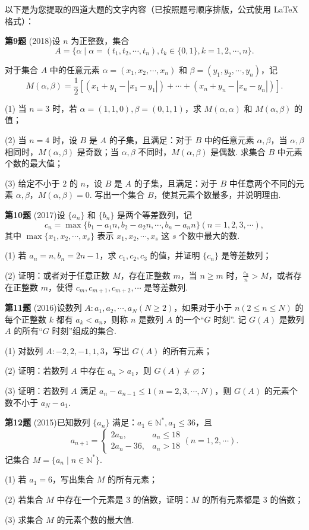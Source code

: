 \documentclass[11pt]{ctexart}
\begin{document}
以下是为您提取的四道大题的文字内容（已按照题号顺序排版，公式使用 LaTeX 格式）：

\clearpage
\textbf{第9题}
(2018)设 $n$ 为正整数，集合
$$
A = \{\alpha \mid \alpha = (t_1, t_2, \cdots, t_n), t_k \in \{0, 1\}, k = 1, 2, \cdots, n\}.
$$

对于集合 $A$ 中的任意元素 $\alpha = (x_1, x_2, \cdots, x_n)$ 和 $\beta = (y_1, y_2, \cdots, y_n)$，记
$$
M(\alpha, \beta) = \frac{1}{2}[(x_1 + y_1 - |x_1 - y_1|) + \cdots + (x_n + y_n - |x_n - y_n|)].
$$

(1) 当 $n = 3$ 时，若 $\alpha = (1, 1, 0), \beta = (0, 1, 1)$，求 $M(\alpha, \alpha)$ 和 $M(\alpha, \beta)$ 的值；

(2) 当 $n = 4$ 时，设 $B$ 是 $A$ 的子集，且满足：对于 $B$ 中的任意元素 $\alpha, \beta$，当 $\alpha, \beta$ 相同时，$M(\alpha, \beta)$ 是奇数；当 $\alpha, \beta$ 不同时，$M(\alpha, \beta)$ 是偶数. 求集合 $B$ 中元素个数的最大值；

(3) 给定不小于 $2$ 的 $n$，设 $B$ 是 $A$ 的子集，且满足：对于 $B$ 中任意两个不同的元素 $\alpha, \beta$，$M(\alpha, \beta) = 0$. 写出一个集合 $B$，使其元素个数最多，并说明理由.

\clearpage
\textbf{第10题}
(2017)设 $\{a_n\}$ 和 $\{b_n\}$ 是两个等差数列，记
$$
c_n = \max\{b_1 - a_1n, b_2 - a_2n, \cdots, b_n - a_nn\} (n = 1, 2, 3, \cdots),
$$
其中 $\max\{x_1, x_2, \cdots, x_s\}$ 表示 $x_1, x_2, \cdots, x_s$ 这 $s$ 个数中最大的数.

(1) 若 $a_n = n, b_n = 2n - 1$，求 $c_1, c_2, c_3$ 的值，并证明 $\{c_n\}$ 是等差数列；

(2) 证明：或者对于任意正数 $M$，存在正整数 $m$，当 $n \ge m$ 时，$\frac{c_n}{n} > M$，或者存在正整数 $m$，使得 $c_m, c_{m+1}, c_{m+2}, \cdots$ 是等差数列.

\clearpage
\textbf{第11题}
(2016)设数列 $A : a_1, a_2, \cdots, a_N (N \ge 2)$，如果对于小于 $n (2 \le n \le N)$ 的每个正整数 $k$ 都有 $a_k < a_n$，则称 $n$ 是数列 $A$ 的一个“$G$ 时刻”. 记 $G(A)$ 是数列 $A$ 的所有“$G$ 时刻”组成的集合.

(1) 对数列 $A : -2, 2, -1, 1, 3$，写出 $G(A)$ 的所有元素；

(2) 证明：若数列 $A$ 中存在 $a_n > a_1$，则 $G(A) \neq \varnothing$；

(3) 证明：若数列 $A$ 满足 $a_n - a_{n-1} \le 1 (n = 2, 3, \cdots, N)$，则 $G(A)$ 的元素个数不小于 $a_N - a_1$.

\clearpage
\textbf{第12题}
(2015)已知数列 $\{a_n\}$ 满足：$a_1 \in \mathbb{N}^*, a_1 \le 36$，且
$$
a_{n+1} = \begin{cases} 2a_n, & a_n \le 18 \\ 2a_n - 36, & a_n > 18 \end{cases} (n = 1, 2, \cdots).
$$
记集合 $M = \{a_n \mid n \in \mathbb{N}^*\}$.

(1) 若 $a_1 = 6$，写出集合 $M$ 的所有元素；

(2) 若集合 $M$ 中存在一个元素是 3 的倍数，证明：$M$ 的所有元素都是 3 的倍数；

(3) 求集合 $M$ 的元素个数的最大值.
\end{document}
